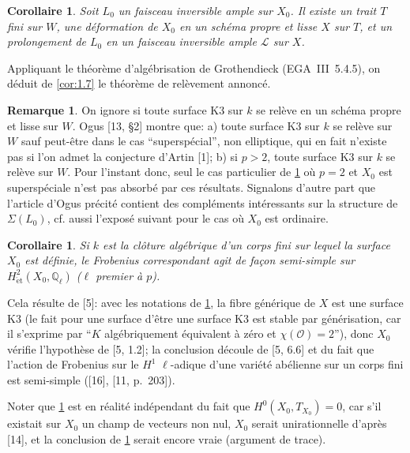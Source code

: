 \documentclass[12pt,a4paper]{article}
\theoremstyle{plain}
\newtheorem{corollary}[theorem]{Corollaire}
\theoremstyle{definition}
\newtheorem{remark}[theorem]{Remarque}
\theoremstyle{remark}
\begin{document}
\begin{corollary}\label{cor:1.8}
Soit $L_0$ un faisceau inversible ample sur $X_0$. Il existe un trait $T$ fini sur $W$, une déformation de $X_0$ en un schéma propre et lisse $X$ sur $T$, et un prolongement de $L_0$ en un faisceau inversible ample $\mathcal{L}$ sur $X$.
\end{corollary}

Appliquant le théorème d'algébrisation de Grothendieck (EGA~III~5.4.5), on déduit de \ref{cor:1.7} le théorème de relèvement annoncé.

\begin{remark}\label{rem:1.9}
On ignore si toute surface K3 sur $k$ se relève en un schéma propre et lisse sur $W$. Ogus [13, §2] montre que: a) toute surface K3 sur $k$ se relève sur $W$ sauf peut-être dans le cas ``superspécial'', non elliptique, qui en fait n'existe pas si l'on admet la conjecture d'Artin [1]; b) si $p > 2$, toute surface K3 sur $k$ se relève sur $W$. Pour l'instant donc, seul le cas particulier de \ref{cor:1.8} où $p = 2$ et $X_0$ est superspéciale n'est pas absorbé par ces résultats. Signalons d'autre part que l'article d'Ogus précité contient des compléments intéressants sur la structure de $\Sigma(L_0)$, cf. aussi l'exposé suivant pour le cas où $X_0$ est ordinaire.
\end{remark}

\begin{corollary}\label{cor:1.10}
Si $k$ est la clôture algébrique d'un corps fini sur lequel la surface $X_0$ est définie, le Frobenius correspondant agit de façon semi-simple sur $H^2_{\mathrm{\acute{e}t}}(X_0, \mathbb{Q}_{\ell})$ ($\ell$ premier à $p$).
\end{corollary}

Cela résulte de [5]: avec les notations de \ref{cor:1.8}, la fibre générique de $X$ est une surface K3 (le fait pour une surface d'être une surface K3 est stable par générisation, car il s'exprime par ``$K$ algébriquement équivalent à zéro et $\chi(\mathcal{O}) = 2$''), donc $X_0$ vérifie l'hypothèse de [5, 1.2]; la conclusion découle de [5, 6.6] et du fait que l'action de Frobenius sur le $H^1$ $\ell$-adique d'une variété abélienne sur un corps fini est semi-simple ([16], [11, p.~203]).

Noter que \ref{cor:1.10} est en réalité indépendant du fait que $H^0(X_0, T_{X_0}) = 0$, car s'il existait sur $X_0$ un champ de vecteurs non nul, $X_0$ serait unirationnelle d'après [14], et la conclusion de \ref{cor:1.10} serait encore vraie (argument de trace).
\end{document}
